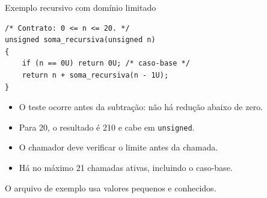 \begin{frame}[fragile]{Exemplo recursivo com domínio limitado}
\begin{lstlisting}
/* Contrato: 0 <= n <= 20. */
unsigned soma_recursiva(unsigned n)
{
    if (n == 0U) return 0U; /* caso-base */
    return n + soma_recursiva(n - 1U);
}
\end{lstlisting}
\begin{itemize}
\item O teste ocorre antes da subtração: não há redução abaixo de zero.
\item Para 20, o resultado é 210 e cabe em \texttt{unsigned}.
\item O chamador deve verificar o limite antes da chamada.
\item Há no máximo 21 chamadas ativas, incluindo o caso-base.
\end{itemize}
\small O arquivo de exemplo usa valores pequenos e conhecidos.
\end{frame}
